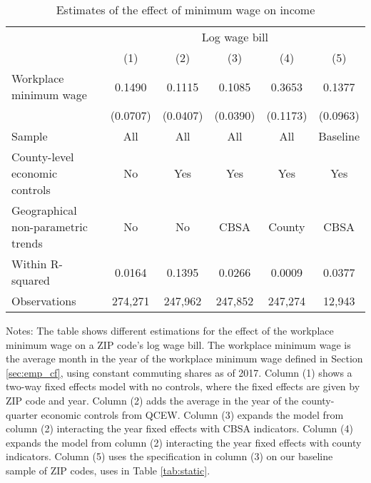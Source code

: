 \begin{table}[]
    \caption{Estimates of the effect of minimum wage on income}
    \label{tab:static_wages}

    \begin{tabular}{@{}lccccc@{}}
        \toprule
                                        & \multicolumn{5}{c}{Log wage bill}                         \\ \cmidrule(l){2-6} 
                                        & (1)       & (2)      & (3)      & (4)      & (5)          \\ \midrule
        Workplace minimum wage             & 0.1490    & 0.1115   & 0.1085   & 0.3653      & 0.1377     \\
                                        & (0.0707)  & (0.0407) & (0.0390) & (0.1173)    & (0.0963)   \\ \midrule
        Sample                             & All       & All      & All      & All       & Baseline     \\
        County-level economic controls     & No        & Yes      & Yes      & Yes       & Yes          \\
        Geographical non-parametric trends & No        & No       & CBSA     & County     & CBSA         \\
        Within R-squared                   & 0.0164   & 0.1395   & 0.0266   & 0.0009     & 0.0377        \\
        Observations                       & 274,271   & 247,962  & 247,852  & 247,274    & 12,943       \\ \bottomrule
    \end{tabular}
    
    \begin{minipage}{.95\textwidth} \footnotesize
        \vspace{2mm}
        Notes: The table shows different estimations for the effect of the workplace minimum 
		wage on a ZIP code's log wage bill.
		The workplace minimum wage is the average month in the year of the workplace minimum 
		wage defined in Section \ref{sec:emp_cf}, using constant commuting shares as of 2017.
		Column (1) shows a two-way fixed effects model with no controls, where the fixed 
		effects are given by ZIP code and year.
		Column (2) adds the average in the year of the county-quarter economic controls from
		QCEW.
		Column (3) expands the model from column (2) interacting the year fixed effects 
		with CBSA indicators.
		Column (4) expands the model from column (2) interacting the year fixed effects 
		with county indicators.
		Column (5) uses the specification in column (3) on our baseline sample of ZIP codes,
		uses in Table \ref{tab:static}.
    \end{minipage}
\end{table}

